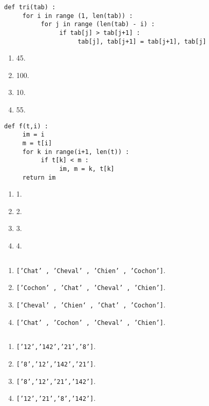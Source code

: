 \begin{lstlisting}
def tri(tab) :
     for i in range (1, len(tab)) :
          for j in range (len(tab) - i) :
               if tab[j] > tab[j+1] :
                    tab[j], tab[j+1] = tab[j+1], tab[j]
\end{lstlisting}
\begin{enumerate}
\item 45. %
\item 100.
\item 10.
\item 55.
\end{enumerate}

\begin{lstlisting}
def f(t,i) :
     im = i
     m = t[i]
     for k in range(i+1, len(t)) :
          if t[k] < m :
               im, m = k, t[k]
     return im
\end{lstlisting}
\begin{enumerate}
\item 1.
\item 2. %
\item 3.
\item 4.
\end{enumerate}

\begin{lstlisting}
\end{lstlisting}
\begin{enumerate}
\item \texttt{['Chat' , 'Cheval' , 'Chien' , 'Cochon']}. %
\item \texttt{['Cochon' , 'Chat' , 'Cheval' , 'Chien']}.
\item \texttt{['Cheval' , 'Chien‘ , 'Chat' , 'Cochon']}.
\item \texttt{['Chat' , 'Cochon' , 'Cheval' , 'Chien']}.
\end{enumerate}

\begin{lstlisting}
\end{lstlisting}
\begin{enumerate}
\item \texttt{['12','142','21','8']}. %
\item \texttt{['8','12','142','21']}.
\item \texttt{['8','12','21','142']}.
\item \texttt{['12','21','8','142']}.
\end{enumerate}

